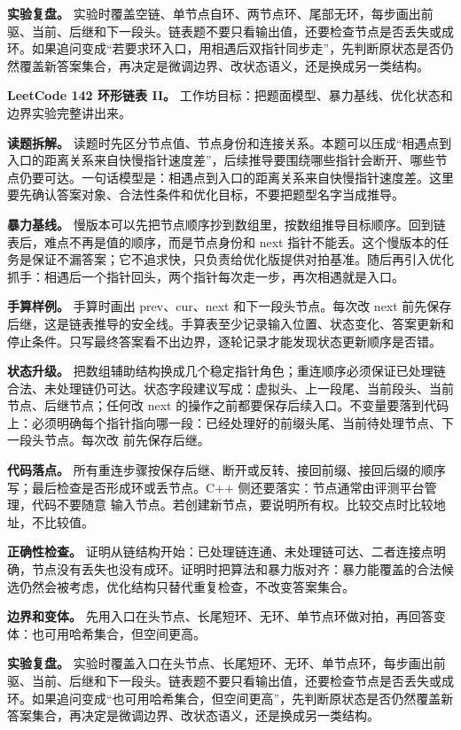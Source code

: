 \textbf{实验复盘。} 实验时覆盖空链、单节点自环、两节点环、尾部无环，每步画出前驱、当前、后继和下一段头。链表题不要只看输出值，还要检查节点是否丢失或成环。如果追问变成“若要求环入口，用相遇后双指针同步走”，先判断原状态是否仍然覆盖新答案集合，再决定是微调边界、改状态语义，还是换成另一类结构。

\noindent\textbf{LeetCode 142 环形链表 II。} 工作坊目标：把题面模型、暴力基线、优化状态和边界实验完整讲出来。

\textbf{读题拆解。} 读题时先区分节点值、节点身份和连接关系。本题可以压成“相遇点到入口的距离关系来自快慢指针速度差”，后续推导要围绕哪些指针会断开、哪些节点仍要可达。一句话模型是：相遇点到入口的距离关系来自快慢指针速度差。这里要先确认答案对象、合法性条件和优化目标，不要把题型名字当成推导。

\textbf{暴力基线。} 慢版本可以先把节点顺序抄到数组里，按数组推导目标顺序。回到链表后，难点不再是值的顺序，而是节点身份和 next 指针不能丢。这个慢版本的任务是保证不漏答案；它不追求快，只负责给优化版提供对拍基准。随后再引入优化抓手：相遇后一个指针回头，两个指针每次走一步，再次相遇就是入口。

\textbf{手算样例。} 手算时画出 prev、cur、next 和下一段头节点。每次改 next 前先保存后继，这是链表推导的安全线。手算表至少记录输入位置、状态变化、答案更新和停止条件。只写最终答案看不出边界，逐轮记录才能发现状态更新顺序是否错。

\textbf{状态升级。} 把数组辅助结构换成几个稳定指针角色；重连顺序必须保证已处理链合法、未处理链仍可达。状态字段建议写成：虚拟头、上一段尾、当前段头、当前节点、后继节点；任何改 next 的操作之前都要保存后续入口。不变量要落到代码上：必须明确每个指针指向哪一段：已经处理好的前缀头尾、当前待处理节点、下一段头节点。每次改  前先保存后继。

\textbf{代码落点。} 所有重连步骤按保存后继、断开或反转、接回前缀、接回后缀的顺序写；最后检查是否形成环或丢节点。C++ 侧还要落实：节点通常由评测平台管理，代码不要随意  输入节点。若创建新节点，要说明所有权。比较交点时比较地址，不比较值。

\textbf{正确性检查。} 证明从链结构开始：已处理链连通、未处理链可达、二者连接点明确，节点没有丢失也没有成环。证明时把算法和暴力版对齐：暴力能覆盖的合法候选仍然会被考虑，优化结构只替代重复检查，不改变答案集合。

\textbf{边界和变体。} 先用入口在头节点、长尾短环、无环、单节点环做对拍，再回答变体：也可用哈希集合，但空间更高。

\textbf{实验复盘。} 实验时覆盖入口在头节点、长尾短环、无环、单节点环，每步画出前驱、当前、后继和下一段头。链表题不要只看输出值，还要检查节点是否丢失或成环。如果追问变成“也可用哈希集合，但空间更高”，先判断原状态是否仍然覆盖新答案集合，再决定是微调边界、改状态语义，还是换成另一类结构。

